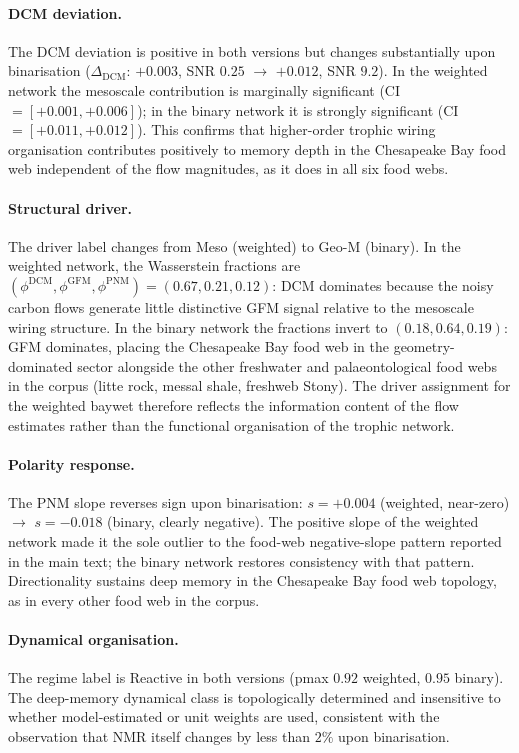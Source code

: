 \documentclass[aps,superscriptaddress,11pt]{revtex4-2}
\theoremstyle{definition}
\theoremstyle{plain}
\begin{document}
\paragraph{DCM deviation.}
The DCM deviation is positive in both versions but changes substantially
upon binarisation ($\Delta_{\mathrm{DCM}}$: $+0.003$, SNR $0.25$ $\to$
$+0.012$, SNR $9.2$).  In the weighted network the mesoscale contribution
is marginally significant (CI $= [+0.001, +0.006]$); in the binary
network it is strongly significant (CI $= [+0.011, +0.012]$).  This
confirms that higher-order trophic wiring organisation contributes
positively to memory depth in the Chesapeake Bay food web independent
of the flow magnitudes, as it does in all six food webs.

\paragraph{Structural driver.}
The driver label changes from Meso (weighted) to Geo-M (binary).  In the
weighted network, the Wasserstein fractions are
$(\phi^{\mathrm{DCM}}, \phi^{\mathrm{GFM}}, \phi^{\mathrm{PNM}}) =
(0.67, 0.21, 0.12)$: DCM dominates because the noisy carbon flows
generate little distinctive GFM signal relative to the mesoscale wiring
structure.  In the binary network the fractions invert to $(0.18, 0.64,
0.19)$: GFM dominates, placing the Chesapeake Bay food web in the
geometry-dominated sector alongside the other freshwater and
palaeontological food webs in the corpus (litte rock, messal shale,
freshweb Stony).  The driver assignment for the weighted baywet therefore
reflects the information content of the flow estimates rather than the
functional organisation of the trophic network.

\paragraph{Polarity response.}
The PNM slope reverses sign upon binarisation: $s = +0.004$ (weighted,
near-zero) $\to$ $s = -0.018$ (binary, clearly negative).  The positive
slope of the weighted network made it the sole outlier to the food-web
negative-slope pattern reported in the main text; the binary network
restores consistency with that pattern.  Directionality sustains deep
memory in the Chesapeake Bay food web topology, as in every other food
web in the corpus.

\paragraph{Dynamical organisation.}
The regime label is Reactive in both versions (pmax $0.92$ weighted,
$0.95$ binary).  The deep-memory dynamical class is topologically
determined and insensitive to whether model-estimated or unit weights are
used, consistent with the observation that NMR itself changes by less than
$2\%$ upon binarisation.
\end{document}
